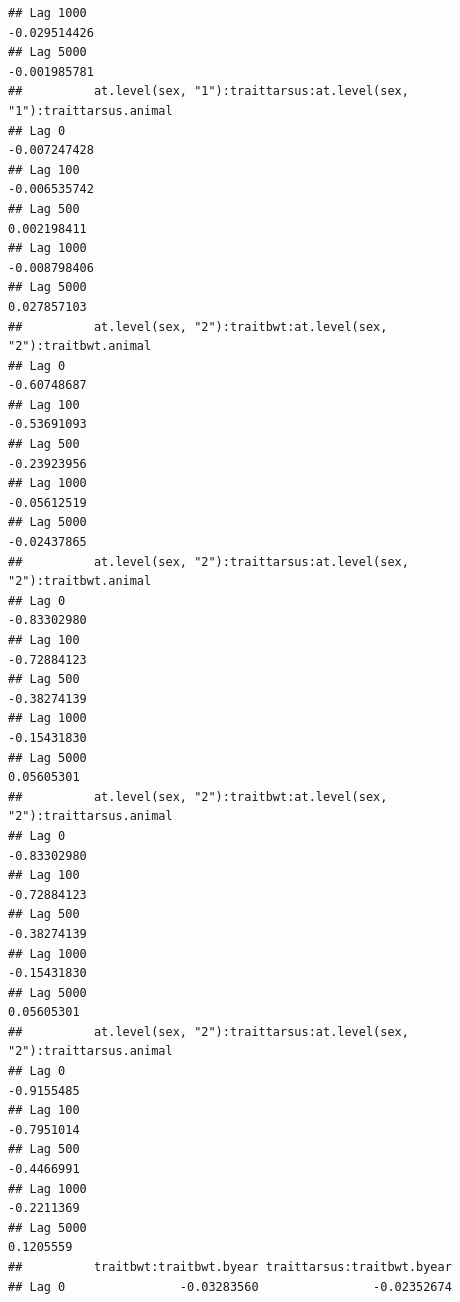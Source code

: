 \documentclass[
  12pt,
]{book}
\begin{document}
\begin{verbatim}
## Lag 1000                                                      -0.029514426
## Lag 5000                                                      -0.001985781
##          at.level(sex, "1"):traittarsus:at.level(sex, "1"):traittarsus.animal
## Lag 0                                                            -0.007247428
## Lag 100                                                          -0.006535742
## Lag 500                                                           0.002198411
## Lag 1000                                                         -0.008798406
## Lag 5000                                                          0.027857103
##          at.level(sex, "2"):traitbwt:at.level(sex, "2"):traitbwt.animal
## Lag 0                                                       -0.60748687
## Lag 100                                                     -0.53691093
## Lag 500                                                     -0.23923956
## Lag 1000                                                    -0.05612519
## Lag 5000                                                    -0.02437865
##          at.level(sex, "2"):traittarsus:at.level(sex, "2"):traitbwt.animal
## Lag 0                                                          -0.83302980
## Lag 100                                                        -0.72884123
## Lag 500                                                        -0.38274139
## Lag 1000                                                       -0.15431830
## Lag 5000                                                        0.05605301
##          at.level(sex, "2"):traitbwt:at.level(sex, "2"):traittarsus.animal
## Lag 0                                                          -0.83302980
## Lag 100                                                        -0.72884123
## Lag 500                                                        -0.38274139
## Lag 1000                                                       -0.15431830
## Lag 5000                                                        0.05605301
##          at.level(sex, "2"):traittarsus:at.level(sex, "2"):traittarsus.animal
## Lag 0                                                              -0.9155485
## Lag 100                                                            -0.7951014
## Lag 500                                                            -0.4466991
## Lag 1000                                                           -0.2211369
## Lag 5000                                                            0.1205559
##          traitbwt:traitbwt.byear traittarsus:traitbwt.byear
## Lag 0                -0.03283560                -0.02352674

\end{verbatim}
\end{document}
